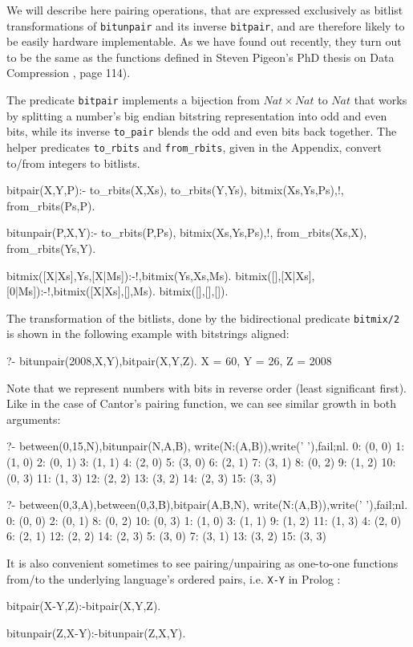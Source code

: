 \documentclass[]{INCLUDES/llncs}
\begin{document}
We will describe here pairing operations, 
that are expressed exclusively as  bitlist transformations of
{\tt bitunpair} and its inverse {\tt bitpair},
and are therefore likely to be easily hardware implementable.
As we have found out recently, they turn out to be the same as the functions
defined in Steven Pigeon's PhD thesis on Data Compression \cite{pigeon}, page 114).

The predicate {\tt bitpair} implements a bijection from $Nat \times
Nat$ to $Nat$ that works by splitting a number's big endian bitstring
representation into odd and even bits, while its inverse {\tt to\_pair} blends
the odd and even bits back together. The helper predicates 
{\tt to\_rbits} and {\tt from\_rbits}, 
given in the Appendix, convert to/from integers to bitlists.
\begin{code}
bitpair(X,Y,P):-
  to_rbits(X,Xs),
  to_rbits(Y,Ys),
  bitmix(Xs,Ys,Ps),!,
  from_rbits(Ps,P).

bitunpair(P,X,Y):-
  to_rbits(P,Ps),
  bitmix(Xs,Ys,Ps),!,
  from_rbits(Xs,X),
  from_rbits(Ys,Y).

bitmix([X|Xs],Ys,[X|Ms]):-!,bitmix(Ys,Xs,Ms).
bitmix([],[X|Xs],[0|Ms]):-!,bitmix([X|Xs],[],Ms).
bitmix([],[],[]).
\end{code}
The transformation of the bitlists, done by the bidirectional predicate
{\tt bitmix/2} is shown in the following example with bitstrings aligned:
\begin{codex}
?- bitunpair(2008,X,Y),bitpair(X,Y,Z).
X = 60,
Y = 26,
Z = 2008

\end{codex}
Note that we represent numbers with bits in reverse order (least significant
first). Like in the case of Cantor's pairing function, we can see similar growth
in both arguments:
\begin{codex}
?- between(0,15,N),bitunpair(N,A,B),
   write(N:(A,B)),write(' '),fail;nl.
0: (0, 0) 1: (1, 0) 2: (0, 1) 3: (1, 1) 
4: (2, 0) 5: (3, 0) 6: (2, 1) 7: (3, 1)
8: (0, 2) 9: (1, 2) 10: (0, 3) 11: (1, 3) 
12: (2, 2) 13: (3, 2) 14: (2, 3) 15: (3, 3)

?- between(0,3,A),between(0,3,B),bitpair(A,B,N),
   write(N:(A,B)),write(' '),fail;nl.
0: (0, 0) 2: (0, 1) 8: (0, 2) 10: (0, 3) 
1: (1, 0) 3: (1, 1) 9: (1, 2) 11: (1, 3) 
4: (2, 0) 6: (2, 1) 12: (2, 2) 14: (2, 3) 
5: (3, 0) 7: (3, 1) 13: (3, 2) 15: (3, 3)
\end{codex}
It is also convenient sometimes to see pairing/unpairing as one-to-one
functions from/to the underlying language's ordered pairs, i.e. {\tt X-Y} in
Prolog :
\begin{code}
bitpair(X-Y,Z):-bitpair(X,Y,Z).

bitunpair(Z,X-Y):-bitunpair(Z,X,Y).
\end{code}
\end{document}
